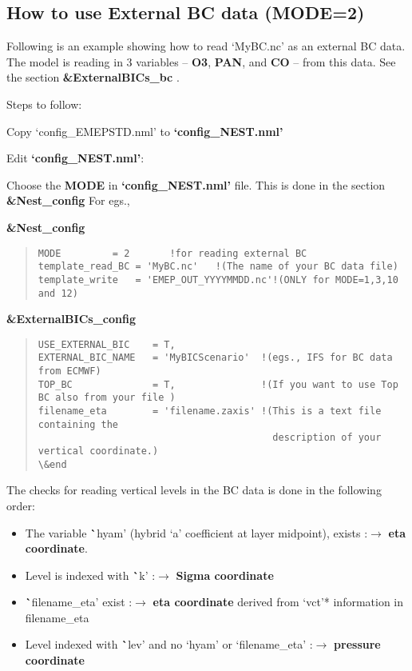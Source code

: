\subsection{How to use External BC data (MODE=2)}

Following is an example showing how to read `MyBC.nc' as an external BC data.  
The model is reading in 3 variables – {\bf O3}, {\bf PAN}, and {\bf CO} – from this data.  See the 	section {\bf \&ExternalBICs\_bc} . 

Steps to follow: 

	Copy `config\_EMEPSTD.nml' to {\bf `config\_NEST.nml'} 

	Edit {\bf `config\_NEST.nml'}:	

	Choose the {\bf MODE} in {\bf `config\_NEST.nml'} file. This is done in the section {\bf \&Nest\_config}
For egs.,

{\bf \&Nest\_config}
\begin{quote}
\begin{verbatim}
MODE		 = 2       !for reading external BC 
template_read_BC = 'MyBC.nc'   !(The name of your BC data file)
template_write   = 'EMEP_OUT_YYYYMMDD.nc'!(ONLY for MODE=1,3,10 and 12)
\end{verbatim}
\end{quote}


{\bf \&ExternalBICs\_config}
\begin{quote}
\begin{verbatim}
USE_EXTERNAL_BIC 	= T,
EXTERNAL_BIC_NAME 	= 'MyBICScenario'  !(egs., IFS for BC data from ECMWF) 
TOP_BC 		    	= T,   		       !(If you want to use Top BC also from your file )
filename_eta		= 'filename.zaxis' !(This is a text file containing the 
                                         description of your vertical coordinate.)			
\&end
\end{verbatim}
\end{quote}


The checks for reading vertical levels in the BC data is done in the following order:
\begin{itemize}
\item The variable {\textbf `hyam'} (hybrid `a' coefficient at layer midpoint), exists :${\rightarrow}$ {\bf eta coordinate}. 
\item Level is indexed with {\textbf `k'}  :${\rightarrow}$ {\bf Sigma coordinate}
\item {\textbf `filename\_eta'} exist :${\rightarrow}$ {\bf eta coordinate} derived from `vct'*  information in filename\_eta
\item Level indexed with {\textbf`lev'} and no `hyam' or `filename\_eta' :${\rightarrow}$ {\bf pressure coordinate}	
\end{itemize}


